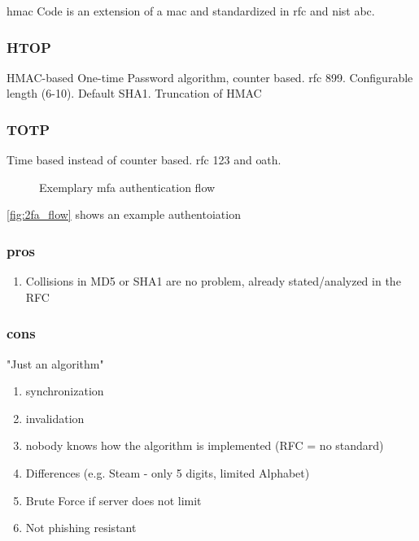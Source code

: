 \gls{hmac} Code is an extension of a \gls{mac} and standardized in \gls{rfc} and \gls{nist} abc.
\cite{krawczyk1997rfc}

\subsubsection{HTOP}
\label{subsubsec:hotp}

HMAC-based One-time Password algorithm, counter based. \gls{rfc} 899. Configurable length (6-10). Default SHA1. Truncation of HMAC
\cite{m2005rfc}

\subsubsection{TOTP}
\label{subsubsec:totp}

Time based instead of counter based. \gls{rfc} 123 and \gls{oath}.
\cite{m2011rfc}

\begin{figure}[hbt]
	\centering
	
	\caption[Exemplary \gls{mfa} authentication flow]{Exemplary \gls{mfa} authentication flow\footnotemark}
	\label{fig:2fa_flow}
\end{figure}

\autoref{fig:2fa_flow} shows an example authentoiation

\subsubsection{pros}

\begin{enumerate}
	\item Collisions in MD5 or SHA1 are no problem, already stated/analyzed in the RFC
\end{enumerate}

\subsubsection{cons}

"Just an algorithm"

\begin{enumerate}
	\item synchronization
	\item invalidation
	\item nobody knows how the algorithm is implemented (RFC = no standard)
	\item Differences (e.g. Steam - only 5 digits, limited Alphabet)
	\item Brute Force if server does not limit
	\item Not phishing resistant
\end{enumerate}